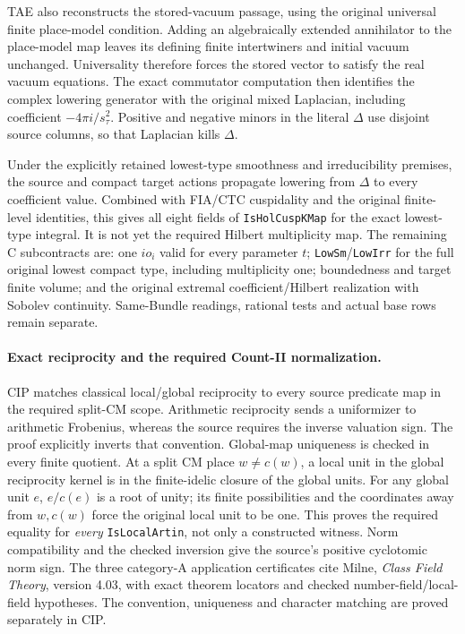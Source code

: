 TAE also reconstructs the stored-vacuum passage, using the original
universal finite place-model condition. Adding an algebraically
extended annihilator to the place-model map leaves its defining
finite intertwiners and initial vacuum unchanged. Universality
therefore forces the stored vector to satisfy the real vacuum
equations. The exact commutator computation then identifies the
complex lowering generator with the original mixed Laplacian,
including coefficient \(-4\pi i/s_\tau^2\). Positive and negative
minors in the literal \(\Delta\) use disjoint source columns, so
that Laplacian kills \(\Delta\).

Under the explicitly retained lowest-type smoothness and
irreducibility premises, the source and compact target actions
propagate lowering from \(\Delta\) to every coefficient value.
Combined with FIA/CTC cuspidality and the original finite-level
identities, this gives all eight fields of
\texttt{IsHolCuspKMap} for the exact lowest-type integral.
It is not yet the required Hilbert multiplicity map.
The remaining C subcontracts are: one \(io_i\) valid for every
parameter \(t\); \texttt{LowSm}/\texttt{LowIrr} for the full
original lowest compact type, including multiplicity one;
boundedness and target finite volume; and the original extremal
coefficient/Hilbert realization with Sobolev continuity. Same-Bundle
readings, rational tests and actual base rows remain separate.

\paragraph{Exact reciprocity and the required Count-II normalization.}
CIP matches classical local/global reciprocity to every source
predicate map in the required split-CM scope. Arithmetic reciprocity
sends a uniformizer to arithmetic Frobenius, whereas the source
requires the inverse valuation sign. The proof explicitly inverts
that convention. Global-map uniqueness is checked in every finite
quotient. At a split CM place \(w\ne c(w)\), a local unit in the
global reciprocity kernel is in the finite-idelic closure of the
global units. For any global unit \(e\), \(e/c(e)\) is a root of
unity; its finite possibilities and the coordinates away from
\(w,c(w)\) force the original local unit to be one. This proves
the required equality for \emph{every} \texttt{IsLocalArtin},
not only a constructed witness. Norm compatibility and the checked
inversion give the source's positive cyclotomic norm sign.
The three category-A application certificates cite Milne,
\emph{Class Field Theory}, version 4.03, with exact theorem locators
and checked number-field/local-field hypotheses. The convention,
uniqueness and character matching are proved separately in CIP.

